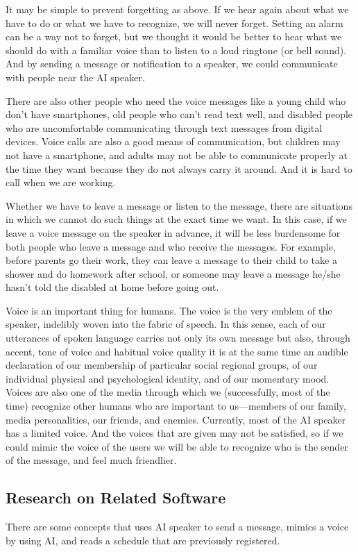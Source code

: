 \documentclass[conference]{IEEEtran}
\begin{document}
It may be simple to prevent forgetting as above. If we hear again about what we have to do or what we have to recognize, we will never forget. Setting an alarm can be a way not to forget, but we thought it would be better to hear what we should do with a familiar voice than to listen to a loud ringtone (or bell sound). And by sending a message or notification to a speaker, we could communicate with people near the AI speaker.

There are also other people who need the voice messages like a young child who don't have smartphones, old people who can't read text well, and disabled people who are uncomfortable communicating through text messages from digital devices. Voice calls are also a good means of communication, but children may not have a smartphone, and adults may not be able to communicate properly at the time they want because they do not always carry it around. And it is hard to call when we are working.

Whether we have to leave a message or listen to the message, there are situations in which we cannot do such things at the exact time we want.
In this case, if we leave a voice message on the speaker in advance, it will be less burdensome for both people who leave a message and who receive the messages. For example, before parents go their work, they can leave a message to their child to take a shower and do homework after school, or someone may leave a message he/she hasn't told the disabled at home before going out.

Voice is an important thing for humans. The voice is the very emblem of the speaker, indelibly woven into the fabric of speech. In this sense, each of our utterances of spoken language carries not only its own message but also, through accent, tone of voice and habitual voice quality it is at the same time an audible declaration of our membership of particular social regional groups, of our individual physical and psychological identity, and of our momentary mood. Voices are also one of the media through which we (successfully, most of the time) recognize other humans who are important to us—members of our family, media personalities, our friends, and enemies. Currently, most of the AI speaker has a limited voice. And the voices that are given may not be satisfied, so if we could mimic the voice of the users we will be able to recognize who is the sender of the message, and feel much friendlier.

\subsection{Research on Related Software}
There are some concepts that uses AI speaker to send a message, mimics a voice by using AI, and reads a schedule that are previously registered.
\end{document}
